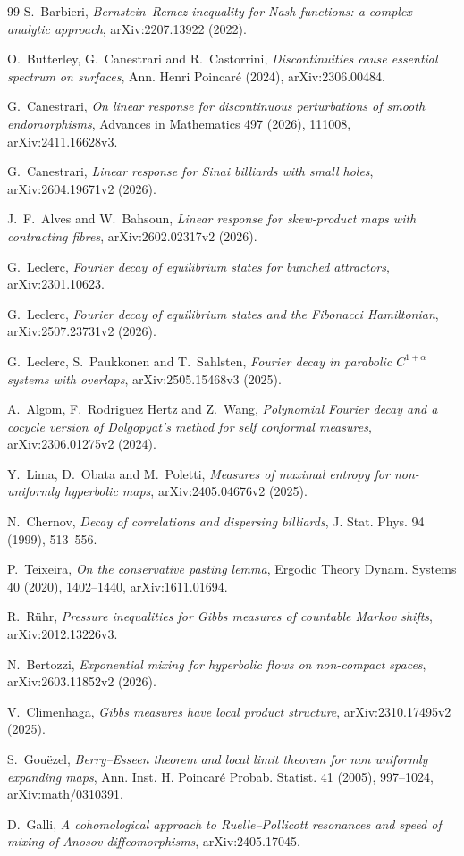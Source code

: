 \documentclass[11pt]{article}
\begin{document}
\begin{thebibliography}{99}
S.~Barbieri,
\emph{Bernstein--Remez inequality for Nash functions: a complex analytic
approach}, arXiv:2207.13922 (2022).

O.~Butterley, G.~Canestrari and R.~Castorrini,
\emph{Discontinuities cause essential spectrum on surfaces},
Ann. Henri Poincar\'e (2024), arXiv:2306.00484.

G.~Canestrari,
\emph{On linear response for discontinuous perturbations of smooth
endomorphisms}, Advances in Mathematics 497 (2026), 111008,
arXiv:2411.16628v3.

G.~Canestrari,
\emph{Linear response for Sinai billiards with small holes},
arXiv:2604.19671v2 (2026).

J.~F.~Alves and W.~Bahsoun,
\emph{Linear response for skew-product maps with contracting fibres},
arXiv:2602.02317v2 (2026).

G.~Leclerc,
\emph{Fourier decay of equilibrium states for bunched attractors},
arXiv:2301.10623.

G.~Leclerc,
\emph{Fourier decay of equilibrium states and the Fibonacci Hamiltonian},
arXiv:2507.23731v2 (2026).

G.~Leclerc, S.~Paukkonen and T.~Sahlsten,
\emph{Fourier decay in parabolic $C^{1+\alpha}$ systems with overlaps},
arXiv:2505.15468v3 (2025).

A.~Algom, F.~Rodriguez Hertz and Z.~Wang,
\emph{Polynomial Fourier decay and a cocycle version of Dolgopyat's method
for self conformal measures}, arXiv:2306.01275v2 (2024).

Y.~Lima, D.~Obata and M.~Poletti,
\emph{Measures of maximal entropy for non-uniformly hyperbolic maps},
arXiv:2405.04676v2 (2025).

N.~Chernov,
\emph{Decay of correlations and dispersing billiards},
J. Stat. Phys. 94 (1999), 513--556.

P.~Teixeira,
\emph{On the conservative pasting lemma},
Ergodic Theory Dynam. Systems 40 (2020), 1402--1440,
arXiv:1611.01694.

R.~R\"uhr,
\emph{Pressure inequalities for Gibbs measures of countable Markov shifts},
arXiv:2012.13226v3.

N.~Bertozzi,
\emph{Exponential mixing for hyperbolic flows on non-compact spaces},
arXiv:2603.11852v2 (2026).

V.~Climenhaga,
\emph{Gibbs measures have local product structure},
arXiv:2310.17495v2 (2025).

S.~Gou\"ezel,
\emph{Berry--Esseen theorem and local limit theorem for non uniformly
expanding maps}, Ann. Inst. H. Poincar\'e Probab. Statist. 41 (2005),
997--1024, arXiv:math/0310391.

D.~Galli,
\emph{A cohomological approach to Ruelle--Pollicott resonances and speed of
mixing of Anosov diffeomorphisms}, arXiv:2405.17045.
\end{thebibliography}
\endgroup
\end{document}
